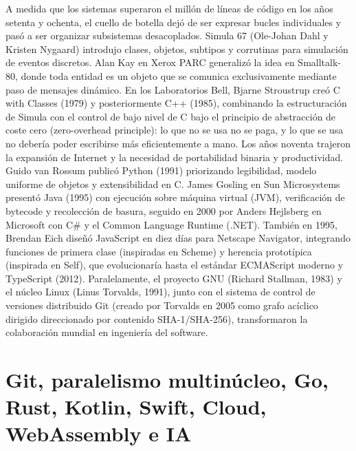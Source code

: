 \documentclass{book}
\begin{document}
A medida que los sistemas superaron el millón de líneas de código en los años setenta y ochenta, el cuello de botella dejó de ser expresar bucles individuales y pasó a ser organizar subsistemas desacoplados. Simula 67 (Ole-Johan Dahl y Kristen Nygaard) introdujo clases, objetos, subtipos y corrutinas para simulación de eventos discretos. Alan Kay en Xerox PARC generalizó la idea en Smalltalk-80, donde toda entidad es un objeto que se comunica exclusivamente mediante paso de mensajes dinámico. En los Laboratorios Bell, Bjarne Stroustrup creó C with Classes (1979) y posteriormente C++ (1985), combinando la estructuración de Simula con el control de bajo nivel de C bajo el principio de abstracción de coste cero (zero-overhead principle): lo que no se usa no se paga, y lo que se usa no debería poder escribirse más eficientemente a mano.
Los años noventa trajeron la expansión de Internet y la necesidad de portabilidad binaria y productividad. Guido van Rossum publicó Python (1991) priorizando legibilidad, modelo uniforme de objetos y extensibilidad en C. James Gosling en Sun Microsystems presentó Java (1995) con ejecución sobre máquina virtual (JVM), verificación de bytecode y recolección de basura, seguido en 2000 por Anders Hejlsberg en Microsoft con C\# y el Common Language Runtime (.NET). También en 1995, Brendan Eich diseñó JavaScript en diez días para Netscape Navigator, integrando funciones de primera clase (inspiradas en Scheme) y herencia prototípica (inspirada en Self), que evolucionaría hasta el estándar ECMAScript moderno y TypeScript (2012). Paralelamente, el proyecto GNU (Richard Stallman, 1983) y el núcleo Linux (Linus Torvalds, 1991), junto con el sistema de control de versiones distribuido Git (creado por Torvalds en 2005 como grafo acíclico dirigido direccionado por contenido SHA-1/SHA-256), transformaron la colaboración mundial en ingeniería del software.

\section{Git, paralelismo multinúcleo, Go, Rust, Kotlin, Swift, Cloud, WebAssembly e IA}
\end{document}
